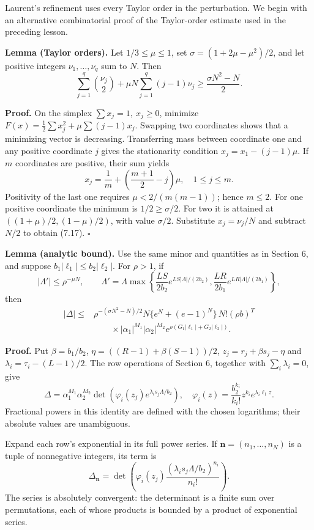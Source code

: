 \documentclass[
  11pt,
  a4paper,
]{article}
\begin{document}
Laurent's refinement uses every Taylor order in the perturbation. We
begin with an alternative combinatorial proof of the Taylor-order
estimate used in the preceding lesson.

\textbf{Lemma (Taylor orders).} Let \(1/3\le\mu\le1\), set
\(\sigma=(1+2\mu-\mu^2)/2\), and let positive integers
\(\nu_1,\ldots,\nu_q\) sum to \(N\). Then \[
\sum_{j=1}^q\binom{\nu_j}{2}
+\mu N\sum_{j=1}^q(j-1)\nu_j
\ge\frac{\sigma N^2-N}{2}. \tag{7.17}
\]

\textbf{Proof.} On the simplex \(\sum x_j=1,\ x_j\ge0\), minimize
\(F(x)=\tfrac12\sum x_j^2+\mu\sum(j-1)x_j\). Swapping two coordinates
shows that a minimizing vector is decreasing. Transferring mass between
coordinate one and any positive coordinate \(j\) gives the stationarity
condition \(x_j=x_1-(j-1)\mu\). If \(m\) coordinates are positive, their
sum yields \[
x_j=\frac1m+\left(\frac{m+1}{2}-j\right)\mu,\quad 1\le j\le m.
\] Positivity of the last one requires \(\mu<2/(m(m-1))\); hence
\(m\le2\). For one positive coordinate the minimum is
\(1/2\ge\sigma/2\). For two it is attained at \(((1+\mu)/2,(1-\mu)/2)\),
with value \(\sigma/2\). Substitute \(x_j=\nu_j/N\) and subtract \(N/2\)
to obtain (7.17). \(\square\)

\textbf{Lemma (analytic bound).} Use the same minor and quantities as in
Section 6, and suppose \(b_1|\ell_1|\le b_2|\ell_2|\). For \(\rho>1\),
if \[
|\Lambda'|\le\rho^{-\mu N},\qquad
\Lambda'=\Lambda\max\left\{
\frac{LS}{2b_2}e^{LS|\Lambda|/(2b_2)},
\frac{LR}{2b_1}e^{LR|\Lambda|/(2b_1)}
\right\},
\] then \[
\begin{aligned}
|\Delta|\le{}&
\rho^{-(\sigma N^2-N)/2}
N\{e^N+(e-1)^N\}\,N!(\rho b)^T\\
&\qquad{}\times|\alpha_1|^{M_1}|\alpha_2|^{M_2}
e^{\rho(G_1|\ell_1|+G_2|\ell_2|)}.
\end{aligned} \tag{7.18}
\]

\textbf{Proof.} Put \(\beta=b_1/b_2\), \(\eta=((R-1)+\beta(S-1))/2\),
\(z_j=r_j+\beta s_j-\eta\) and \(\lambda_i=\tau_i-(L-1)/2\). The row
operations of Section 6, together with \(\sum_i\lambda_i=0\), give \[
\Delta=\alpha_1^{M_1}\alpha_2^{M_2}
\det\left(\varphi_i(z_j)e^{\lambda_i s_j\Lambda/b_2}\right),
\quad
\varphi_i(z)=\frac{b_2^{k_i}}{k_i!}z^{k_i}e^{\lambda_i\ell_1z}.
\] Fractional powers in this identity are defined with the chosen
logarithms; their absolute values are unambiguous.

Expand each row's exponential in its full power series. If
\(\mathbf n=(n_1,\ldots,n_N)\) is a tuple of nonnegative integers, its
term is \[
\Delta_{\mathbf n}=
\det\left(\varphi_i(z_j)
\frac{(\lambda_i s_j\Lambda/b_2)^{n_i}}{n_i!}\right).
\] The series is absolutely convergent: the determinant is a finite sum
over permutations, each of whose products is bounded by a product of
exponential series.
\end{document}

